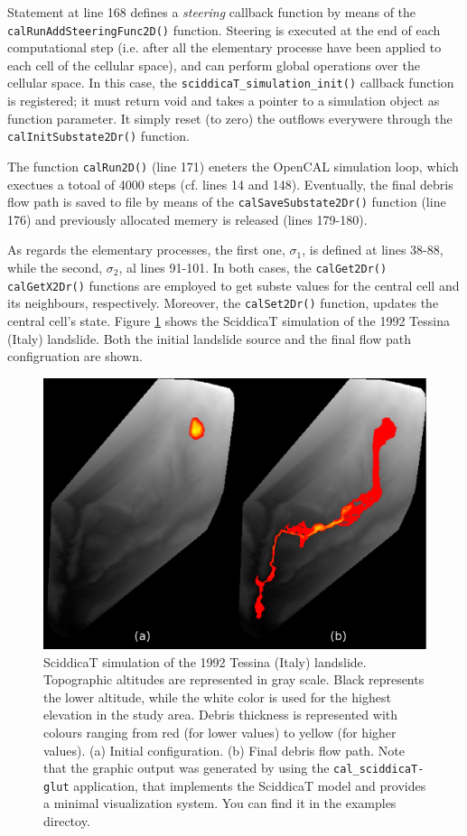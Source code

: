 Statement at line 168 defines a \emph{steering} callback function by
means of the \verb'calRunAddSteeringFunc2D()' function. Steering is
executed at the end of each computational step (i.e. after all the
elementary processe have been applied to each cell of the cellular
space), and can perform global operations over the cellular space. In
this case, the \verb'sciddicaT_simulation_init()' callback function is
registered; it must return void and takes a pointer to a simulation
object as function parameter. It simply reset (to zero) the outflows
everywere through the \verb'calInitSubstate2Dr()' function.

The function \verb'calRun2D()' (line 171) eneters the OpenCAL
simulation loop, which exectues a totoal of 4000 steps (cf. lines 14
and 148). Eventually, the final debris flow path is saved to file by
means of the \verb'calSaveSubstate2Dr()' function (line 176) and
previously allocated memery is released (lines 179-180).

As regards the elementary processes, the first one, $\sigma_1$, is
defined at lines 38-88, while the second, $\sigma_2$, al lines
91-101. In both cases, the \verb'calGet2Dr()' \verb'calGetX2Dr()'
functions are employed to get subste values for the central cell and
its neighbours, respectively. Moreover, the \verb'calSet2Dr()'
function, updates the central cell's state. Figure \ref{fig:sciddicaT}
shows the SciddicaT simulation of the 1992 Tessina (Italy)
landslide. Both the initial landslide source and the final flow path
configruation are shown.

\begin{figure}[htbp]
  \centering
  \includegraphics[width=12cm]{./images/OpenCAL/sciddicaT}
  \caption{SciddicaT simulation of the 1992 Tessina (Italy)
    landslide. Topographic altitudes are represented in gray
    scale. Black represents the lower altitude, while the white color
    is used for the highest elevation in the study area. Debris
    thickness is represented with colours ranging from red (for lower
    values) to yellow (for higher values). (a) Initial
    configuration. (b) Final debris flow path. Note that the graphic
    output was generated by using the \texttt{cal\_sciddicaT-glut}
    application, that implements the SciddicaT model and provides a
    minimal visualization system. You can find it in the examples
    directoy.}
  \label{fig:sciddicaT}
\end{figure}

